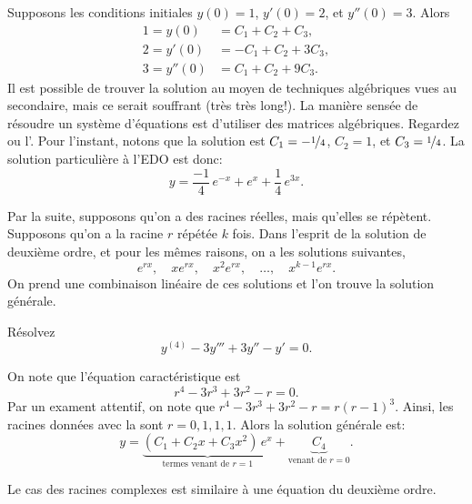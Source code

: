 \begin{example}
Supposons les conditions initiales $y(0) = 1$, $y'(0) = 2$,
et $y''(0) = 3$.  Alors
\begin{align*}
1 = y(0) & = C_1 + C_2 + C_3 , \\
2 = y'(0) & = -C_1 + C_2 + 3C_3 , \\
3 = y''(0) & = C_1 + C_2 + 9C_3 .
\end{align*}
Il est possible de trouver la solution au moyen de techniques algébriques vues au secondaire, mais ce serait souffrant (très très long!). La manière sensée de résoudre un système d'équations est d'utiliser des matrices algébriques. Regardez  ou l'.
Pour l'instant, notons que la solution est  $C_1 =
-\nicefrac{1}{4}$,
$C_2 = 1$, et $C_3 = \nicefrac{1}{4}$.  La solution particulière à l'EDO est donc:
\begin{equation*}
y = \frac{-1}{4}\, e^{-x} + e^x + \frac{1}{4}\, e^{3x} .
\end{equation*}
\end{example}

Par la suite, supposons qu'on a des racines réelles, mais qu'elles se répètent. Supposons qu'on a la racine $r$ répétée $k$ fois. Dans l'esprit de la solution de deuxième ordre, et pour les mêmes raisons, on a les solutions  suivantes,\: 
\begin{equation*}
e^{rx}, \quad xe^{rx}, \quad x^2 e^{rx}, \quad \ldots, \quad x^{k-1} e^{rx} .
\end{equation*}
On prend une combinaison linéaire de ces solutions et l'on trouve la solution générale. 
\begin{example}
Résolvez
\begin{equation*}
y^{(4)} - 3 y''' + 3 y'' - y' =  0 .
\end{equation*}

On note que l'équation caractéristique est 
\begin{equation*}
r^4 - 3r^3 + 3r^2 -r = 0 .
\end{equation*}
Par un exament attentif, on note que  $r^4 - 3r^3 + 3r^2 -r = r{(r-1)}^3$.  Ainsi, les racines données avec la 
 sont $r = 0, 1, 1, 1$.  Alors la solution générale est: 
\begin{equation*}
y = \underbrace{(C_1 + C_2 x + C_3 x^2)\, e^x}_{\text{termes venant de }
r=1} + \underbrace{C_4}_{\text{venant de } r=0} .
\end{equation*}
\end{example}

Le cas des racines complexes est similaire à une équation du deuxième ordre. 

